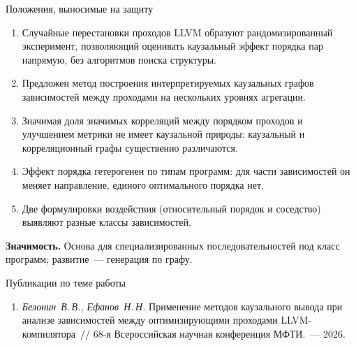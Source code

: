\documentclass[aspectratio=43]{beamer}
\begin{document}
\begin{frame}{Положения, выносимые на защиту}
  \small
  \begin{enumerate}\setlength{\itemsep}{1pt}
    \item Случайные перестановки проходов LLVM образуют рандомизированный
      эксперимент, позволяющий оценивать каузальный эффект порядка пар напрямую,
      без алгоритмов поиска структуры.
    \item Предложен метод построения интерпретируемых каузальных графов
      зависимостей между проходами на нескольких уровнях агрегации.
    \item Значимая доля значимых корреляций между порядком проходов и улучшением
      метрики не имеет каузальной природы: каузальный и корреляционный графы
      существенно различаются.
    \item Эффект порядка гетерогенен по типам программ: для части зависимостей он
      меняет направление, единого оптимального порядка нет.
    \item Две формулировки воздействия (относительный порядок и соседство)
      выявляют разные классы зависимостей.
  \end{enumerate}

  \smallskip
  {\color{slideblue}\bfseries Значимость.} Основа для специализированных
  последовательностей под класс программ; развитие~--- генерация по графу.
\end{frame}

\begin{frame}{Публикации по теме работы}
  \begin{enumerate}
    \item \emph{Белонин~В.\,В., Ефанов~Н.\,Н.} Применение методов каузального
      вывода при анализе зависимостей между оптимизирующими проходами
      LLVM-компилятора~// 68-я Всероссийская научная конференция МФТИ.~--- 2026.
  \end{enumerate}
\end{frame}
\end{document}
